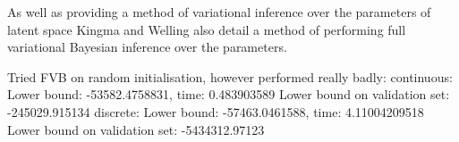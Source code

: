 \documentclass[../report.tex]{subfiles}
\begin{document}
As well as providing a method of variational inference over the parameters of latent space Kingma and Welling also detail a method of performing full variational Bayesian inference over the parameters.


Tried FVB on random initialisation, however performed really badly:
continuous:
Lower bound: -53582.4758831, time: 0.483903589
Lower bound on validation set: -245029.915134
discrete:
Lower bound: -57463.0461588, time: 4.11004209518
Lower bound on validation set: -5434312.97123
\end{document}
